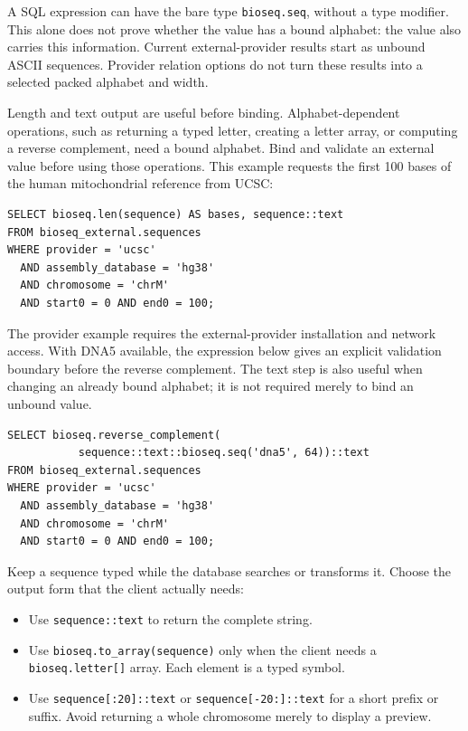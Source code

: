 A SQL expression can have the bare type \texttt{bioseq.seq}, without a type
modifier. This alone does not prove whether the value has a bound alphabet:
the value also carries this information. Current external-provider results
start as unbound ASCII sequences. Provider relation options do not turn
these results into a selected packed alphabet and width.

Length and text output are useful before binding. Alphabet-dependent
operations, such as returning a typed letter, creating a letter array, or
computing a reverse complement, need a bound alphabet. Bind and validate an
external value before using those operations. This example requests the
first 100 bases of the human mitochondrial reference from UCSC:

\par\noindent\begin{minipage}{\linewidth}
\begin{lstlisting}[style=bioseq-appendix-sql]
SELECT bioseq.len(sequence) AS bases, sequence::text
FROM bioseq_external.sequences
WHERE provider = 'ucsc'
  AND assembly_database = 'hg38'
  AND chromosome = 'chrM'
  AND start0 = 0 AND end0 = 100;
\end{lstlisting}
\end{minipage}

The provider example requires the external-provider installation and network
access. With DNA5 available, the expression below gives an explicit
validation boundary before the reverse complement. The text step is also
useful when changing an already bound alphabet; it is not required merely
to bind an unbound value.

\par\noindent\begin{minipage}{\linewidth}
\begin{lstlisting}[style=bioseq-appendix-sql]
SELECT bioseq.reverse_complement(
           sequence::text::bioseq.seq('dna5', 64))::text
FROM bioseq_external.sequences
WHERE provider = 'ucsc'
  AND assembly_database = 'hg38'
  AND chromosome = 'chrM'
  AND start0 = 0 AND end0 = 100;
\end{lstlisting}
\end{minipage}

Keep a sequence typed while the database searches or transforms it. Choose
the output form that the client actually needs:
\begin{itemize}
  \item Use \texttt{sequence::text} to return the complete string.
  \item Use \texttt{bioseq.to\_array(sequence)} only when the client needs a
    \texttt{bioseq.letter[]} array. Each element is a typed symbol.
  \item Use \texttt{sequence[:20]::text} or
    \texttt{sequence[-20:]::text} for a short prefix or suffix. Avoid
    returning a whole chromosome merely to display a preview.
\end{itemize}

